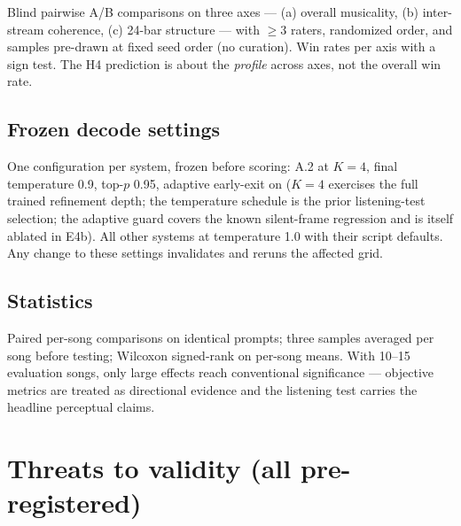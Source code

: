 \documentclass[11pt]{article}
\begin{document}
Blind pairwise A/B comparisons on three axes --- (a) overall
musicality, (b) inter-stream coherence, (c) 24-bar structure --- with
$\ge 3$ raters, randomized order, and samples pre-drawn at fixed seed
order (no curation). Win rates per axis with a sign test. The H4
prediction is about the \emph{profile} across axes, not the overall
win rate.

\subsection{Frozen decode settings}

One configuration per system, frozen before scoring: A.2 at $K{=}4$,
final temperature 0.9, top-$p$ 0.95, adaptive early-exit on ($K{=}4$
exercises the full trained refinement depth; the temperature schedule
is the prior listening-test selection; the adaptive guard covers the
known silent-frame regression and is itself ablated in E4b). All
other systems at temperature 1.0 with their script defaults. Any
change to these settings invalidates and reruns the affected grid.

\subsection{Statistics}

Paired per-song comparisons on identical prompts; three samples
averaged per song before testing; Wilcoxon signed-rank on per-song
means. With 10--15 evaluation songs, only large effects reach
conventional significance --- objective metrics are treated as
directional evidence and the listening test carries the headline
perceptual claims.

\section{Threats to validity (all pre-registered)}
\end{document}
